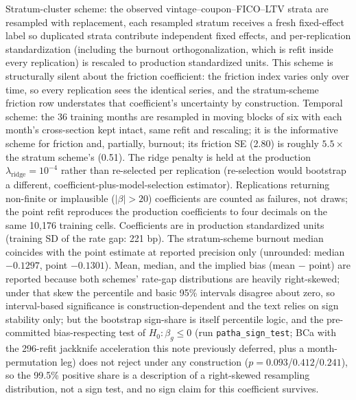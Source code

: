 \documentclass[12pt]{article}
\begin{document}
\begin{table}[H]
\begin{threeparttable}
\begin{tablenotes}[flushleft]
\item Stratum-cluster scheme: the observed vintage--coupon--FICO--LTV strata are resampled with replacement, each resampled stratum receives a fresh fixed-effect label so duplicated strata contribute independent fixed effects, and per-replication standardization (including the burnout orthogonalization, which is refit inside every replication) is rescaled to production standardized units. This scheme is structurally silent about the friction coefficient: the friction index varies only over time, so every replication sees the identical series, and the stratum-scheme friction row understates that coefficient's uncertainty by construction. Temporal scheme: the 36 training months are resampled in moving blocks of six with each month's cross-section kept intact, same refit and rescaling; it is the informative scheme for friction and, partially, burnout; its friction SE (2.80) is roughly $5.5\times$ the stratum scheme's (0.51). The ridge penalty is held at the production $\lambda_{\mathrm{ridge}} = 10^{-4}$ rather than re-selected per replication (re-selection would bootstrap a different, coefficient-plus-model-selection estimator). Replications returning non-finite or implausible ($|\beta| > 20$) coefficients are counted as failures, not draws; the point refit reproduces the production coefficients to four decimals on the same 10,176 training cells. Coefficients are in production standardized units (training SD of the rate gap: 221 bp). The stratum-scheme burnout median coincides with the point estimate at reported precision only (unrounded: median $-0.1297$, point $-0.1301$). Mean, median, and the implied bias (mean $-$ point) are reported because both schemes' rate-gap distributions are heavily right-skewed; under that skew the percentile and basic 95\% intervals disagree about zero, so interval-based significance is construction-dependent and the text relies on sign stability only; but the bootstrap sign-share is itself percentile logic, and the pre-committed bias-respecting test of $H_0\!: \beta_g \le 0$ (run \texttt{patha\_sign\_test}; BCa with the 296-refit jackknife acceleration this note previously deferred, plus a month-permutation leg) does not reject under any construction ($p = 0.093$/$0.412$/$0.241$), so the 99.5\% positive share is a description of a right-skewed resampling distribution, not a sign test, and no sign claim for this coefficient survives.
\end{tablenotes}
\end{threeparttable}
\end{table}
\end{document}
